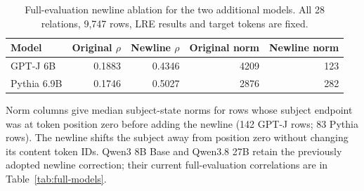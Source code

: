 \begin{table}[t]
\centering\small
\caption{Full-evaluation newline ablation for the two additional models. All 28 relations, 9,747 rows, LRE results and target tokens are fixed.}
\label{tab:full-newline}
\begin{tabular}{@{}lrrrr@{}}
\toprule
Model & Original $\rho$ & Newline $\rho$ & Original norm & Newline norm \\
\midrule
GPT-J 6B & 0.1883 & 0.4346 & 4209 & 123 \\
Pythia 6.9B & 0.1746 & 0.5027 & 2876 & 282 \\
\bottomrule
\end{tabular}
\par\smallskip\begin{minipage}{\linewidth}\footnotesize Norm columns give median subject-state norms for rows whose subject endpoint was at token position zero before adding the newline (142 GPT-J rows; 83 Pythia rows). The newline shifts the subject away from position zero without changing its content token IDs. Qwen3 8B Base and Qwen3.8 27B retain the previously adopted newline correction; their current full-evaluation correlations are in Table~\ref{tab:full-models}.\end{minipage}
\end{table}
